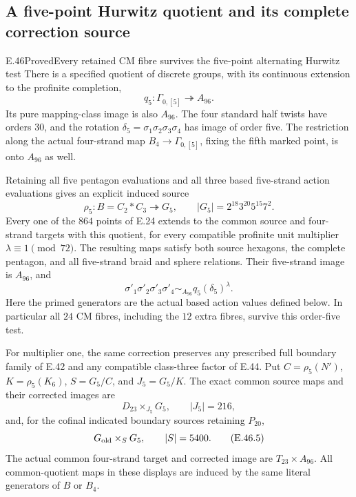 \subsection{A five-point Hurwitz quotient and its complete correction source}

\begin{statement}{E.46}{Proved}{Every retained CM fibre survives the five-point alternating Hurwitz test}
There is a specified quotient of discrete groups, with its continuous
extension to the profinite completion,
\[
 q_5:\Gamma_{0,[5]}\twoheadrightarrow A_{96}.
 \tag{E.46.1}
\]
Its pure mapping-class image is also $A_{96}$.  The four standard
half twists have orders $30$, and the rotation
$\delta_5=\sigma_1\sigma_2\sigma_3\sigma_4$ has image of order five.
The restriction along the actual four-strand map
$B_4\to\Gamma_{0,[5]}$, fixing the fifth marked point, is onto
$A_{96}$ as well.

Retaining all five pentagon evaluations and all three based
five-strand action evaluations gives an explicit induced source
\[
 \rho_5:B=C_2*C_3\twoheadrightarrow G_5,
       \qquad |G_5|=2^{18}3^{20}5^{15}7^2.
 \tag{E.46.2}
\]
Every one of the $864$ points of E.24 extends to the common source
and four-strand targets with this quotient, for every compatible
profinite unit multiplier $\lambda\equiv1\pmod{72}$.
The resulting maps satisfy both source hexagons, the complete
pentagon, and all five-strand braid and sphere relations.
Their five-strand image is $A_{96}$, and
\[
 \sigma'_1\sigma'_2\sigma'_3\sigma'_4
             \sim_{A_{96}} q_5(\delta_5)^\lambda.
 \tag{E.46.3}
\]
Here the primed generators are the actual based action values
defined below.  In particular all $24$ CM fibres, including the
$12$ extra fibres, survive this order-five test.

For multiplier one, the same correction preserves any prescribed
full boundary family of E.42 and any compatible class-three factor
of E.44.  Put $C=\rho_5(N')$, $K=\rho_5(K_6)$, $S=G_5/C$,
and $J_5=G_5/K$.  The exact common source maps and their corrected
images are
\[
 D_{23}\times_{J_5}G_5,
       \qquad |J_5|=216,
 \tag{E.46.4}
\]
and, for the cofinal indicated boundary sources retaining $P_{20}$,
\[
                 G_{\rm old}\times_S G_5,
                 \qquad |S|=5400.
 \tag{E.46.5}
\]
The actual common four-strand target and corrected image are
$T_{23}\times A_{96}$.
All common-quotient maps in these displays are induced by the
same literal generators of $B$ or $B_4$.
\end{statement}

